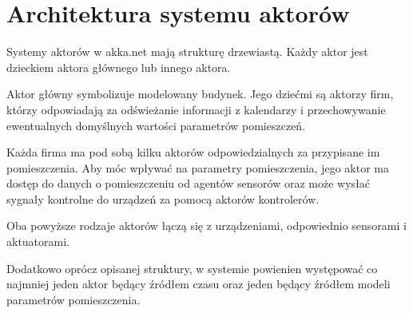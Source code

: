 \section{Architektura systemu aktorów}
Systemy aktorów w akka.net mają strukturę drzewiastą. 
Każdy aktor jest dzieckiem aktora głównego lub innego aktora. 



Aktor główny symbolizuje modelowany budynek.
Jego dziećmi są aktorzy firm, którzy odpowiadają za odświeżanie informacji z kalendarzy i przechowywanie ewentualnych domyślnych wartości parametrów pomieszczeń.

Każda firma ma pod sobą kilku aktorów odpowiedzialnych za przypisane im pomieszczenia.
Aby móc wpływać na parametry pomieszczenia, jego aktor ma dostęp do danych o pomieszczeniu od agentów sensorów oraz może wysłać sygnały kontrolne do urządzeń za pomocą aktorów kontrolerów.

Oba powyższe rodzaje aktorów łączą się z urządzeniami, odpowiednio sensorami i aktuatorami.

Dodatkowo oprócz opisanej struktury, w systemie powienien występować co najmniej jeden aktor będący źródłem czasu oraz jeden będący źródłem modeli parametrów pomieszczenia.
